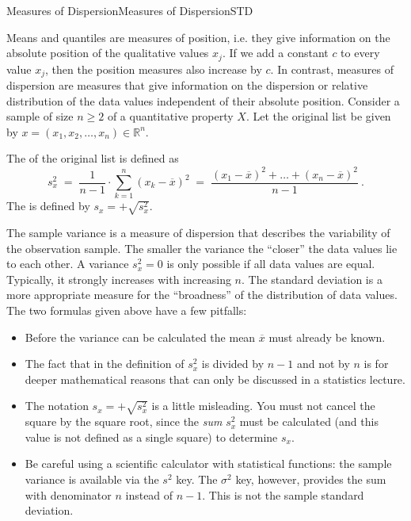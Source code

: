 \begin{MXContent}{Measures of Dispersion}{Measures of Dispersion}{STD}

Means and quantiles are measures of position, i.e. they give information on the absolute position of the 
qualitative values $x_j$. If we add a constant $c$ to every value $x_j$, then the position measures also increase 
by $c$. In contrast, measures of dispersion are measures that give information on the dispersion or relative 
distribution of the data values independent of their absolute position. Consider a sample of size $n\geq 2$ 
of a quantitative property $X$. Let the original list be given by $x=(x_{1},x_{2},\ldots ,x_{n})\in \mathbb{R}^{n}$.

\begin{MInfo}
The  of the original list is defined as
$$
s_{x}^{2}\;=\; \frac{1}{n-1}\cdot \sum\limits_{k=1}^{n}(x_{k}-\overline{x})^{2}\; =\; \frac{(x_{1}-\overline{x})^{2}+ \ldots +(x_{n}-\overline{x})^{2}}{n-1}\: .
$$
The  is defined by $s_{x}=+\sqrt{s_{x}^{2}}$.
\end{MInfo}

The sample variance is a measure of dispersion that describes the variability of the observation sample. 
The smaller the variance the ``closer'' the data values lie to each other. A variance $s_x^2=0$ is only 
possible if all data values are equal. Typically, it strongly increases with increasing $n$. The  
standard deviation is a more appropriate measure for the ``broadness'' of the distribution of data values. 
The two formulas given above have a few pitfalls:

\begin{itemize}
\item{Before the variance can be calculated the mean $\overline{x}$ must already be known.}
\item{The fact that in the definition of $s_{x}^{2}$ is divided by $n-1$ and not by $n$ is for 
deeper mathematical reasons that can only be discussed in a statistics lecture.}
\item{The notation $s_{x}=+\sqrt{s_{x}^{2}}$ is a little misleading. You must not cancel the square by 
the square root, since the \textit{sum} $s^2_x$ must be calculated (and this value is not defined as a single square)
to determine $s_x$.}
\item{Be careful using a scientific calculator with statistical functions: the sample variance 
is available via the $s^2$ key. The $\sigma^2$ key, however, provides the sum with denominator 
$n$ instead of $n-1$. This is not the sample standard deviation.}
\end{itemize}


\end{MXContent}
